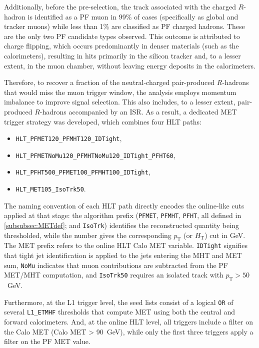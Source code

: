 Additionally, before the pre-selection, the track associated with the charged $R$-hadron is identified as a PF muon in 99\% of cases (specifically as global and tracker muons) while less than 1\% are classified as PF charged hadrons. These are the only two PF candidate types observed. This outcome is attributed to charge flipping, which occurs predominantly in denser materials (such as the calorimeters), resulting in hits primarily in the silicon tracker and, to a lesser extent, in the muon chamber, without leaving energy deposits in the calorimeters.


\vspace{0.5 cm}

Therefore, to recover a fraction of the neutral-charged pair-produced $R$-hadrons that would miss the muon trigger window, the analysis employs momentum imbalance to improve signal selection. This also includes, to a lesser extent, pair-produced $R$-hadrons accompanied by an ISR. As a result, a dedicated MET trigger strategy was developed, which combines four HLT paths:

\begin{itemize}
    \item[] \texttt{HLT\_PFMET120\_PFMHT120\_IDTight},
    \item[\texttt{OR}] \texttt{HLT\_PFMETNoMu120\_PFMHTNoMu120\_IDTight\_PFHT60},
    \item[\texttt{OR}] \texttt{HLT\_PFHT500\_PFMET100\_PFMHT100\_IDTight},
    \item[\texttt{OR}] \texttt{HLT\_MET105\_IsoTrk50}.
\end{itemize}

The naming convention of each HLT path directly encodes the online-like cuts applied at that stage: the algorithm prefix (\texttt{PFMET}, \texttt{PFMHT}, \texttt{PFHT}, all defined in \cref{subsubsec:METdef}; and \texttt{IsoTrk}) identifies the reconstructed quantity being thresholded, while the number gives the corresponding $p_{\mathrm{T}}$ (or $H_{\mathrm{T}}$) cut in GeV. The MET prefix refers to the online HLT Calo MET variable. \texttt{IDTight} signifies that tight jet identification is applied to the jets entering the MHT and MET sum, \texttt{NoMu} indicates that muon contributions are subtracted from the PF MET/MHT computation, and \texttt{IsoTrk50} requires an isolated track with $p_{\mathrm{T}}>50$~GeV. 

Furthermore, at the L1 trigger level, the seed lists consist of a logical \texttt{OR} of several \texttt{L1\_ETMHF} thresholds that compute MET using both the central and forward calorimeters. And, at the online HLT level, all triggers include a filter on the Calo MET (Calo MET > 90~GeV), while only the first three triggers apply a filter on the PF MET value.

